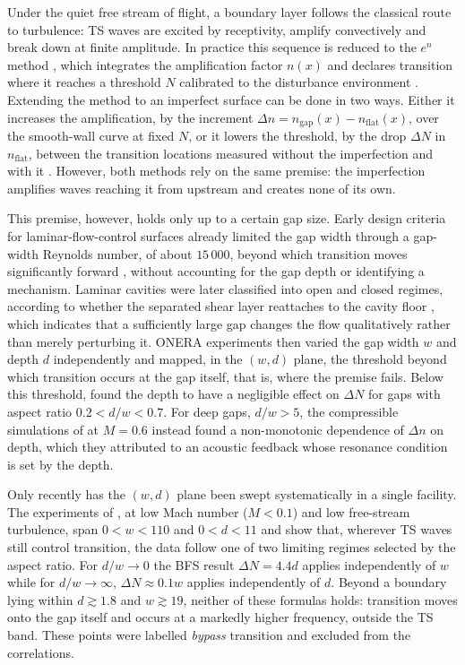 \documentclass[lineno]{jfm}
\begin{document}
Under the quiet free stream of flight, a boundary layer follows the classical route to turbulence: \ac{TS} waves are excited by receptivity, amplify convectively and break down at finite amplitude. In practice this sequence is reduced to the $e^{n}$ method \citep{smithgamberoni,vanIngen1956}, which integrates the amplification factor $n(x)$ and declares transition where it reaches a threshold $N$ calibrated to the disturbance environment \citep{crouchNgKachanov2015}. Extending the method to an imperfect surface can be done in two ways.  Either it increases the amplification, by the increment $\Delta n=n_\mathrm{gap}(x)-n_\mathrm{flat}(x)$, over the smooth-wall curve at fixed $N$, or it lowers the threshold, by the drop $\Delta N$ in $n_\mathrm{flat}$, between the transition locations measured without the imperfection and with it \citep{crouchKosoryginNg2006,perraudArnalKuehn2014,crouch2021predicting}. However, both methods rely on the same premise: the imperfection amplifies waves reaching it from upstream and creates none of its own.

This premise, however, holds only up to a certain gap size. Early design criteria for laminar-flow-control surfaces already limited the gap width through a gap-width Reynolds number, of about $15\,000$, beyond which transition moves significantly forward \citep{nenniGluyas1966}, without accounting for the gap depth or identifying a mechanism. Laminar cavities were later classified into open and closed regimes, according to whether the separated shear layer reattaches to the cavity floor \citep{sinhaGuptaOberai1982,Zhang2005,Crook2013}, which indicates that a sufficiently large gap changes the flow qualitatively rather than merely perturbing it. ONERA experiments \citep{oliveBlanchard1982,seraudie2010,gentili2012} then varied the gap width $w$ and depth $d$ independently and mapped, in the $(w,d)$ plane, the threshold beyond which transition occurs at the gap itself, that is, where the premise fails. Below this threshold, \citet{beguetONERA} found the depth to have a negligible effect on $\Delta N$ for gaps with aspect ratio $0.2<d/w<0.7$. For deep gaps, $d/w>5$, the compressible simulations of \citet{zahnRist} at $M=0.6$ instead found a non-monotonic dependence of $\Delta n$ on depth, which they attributed to an acoustic feedback whose resonance condition is set by the depth.

Only recently has the $(w,d)$ plane been swept systematically in a single facility. The experiments of \citet{jeffGaps}, at low Mach number ($M<0.1$) and low free-stream turbulence, span $0<w<110$ and $0<d<11$ and show that, wherever \ac{TS} waves still control transition, the data follow one of two limiting regimes selected by the aspect ratio. For $d/w\to 0$ the \ac{BFS} result $\Delta N=4.4d$ applies independently of $w$ while for $d/w\to\infty$, $\Delta N\approx0.1w$ applies independently of $d$. Beyond a boundary lying within $d\gtrsim1.8$ and $w\gtrsim19$, neither of these formulas holds: transition moves onto the gap itself and occurs at a markedly higher frequency, outside the \ac{TS} band. These points were labelled \emph{bypass} transition and excluded from the correlations.
\end{document}
